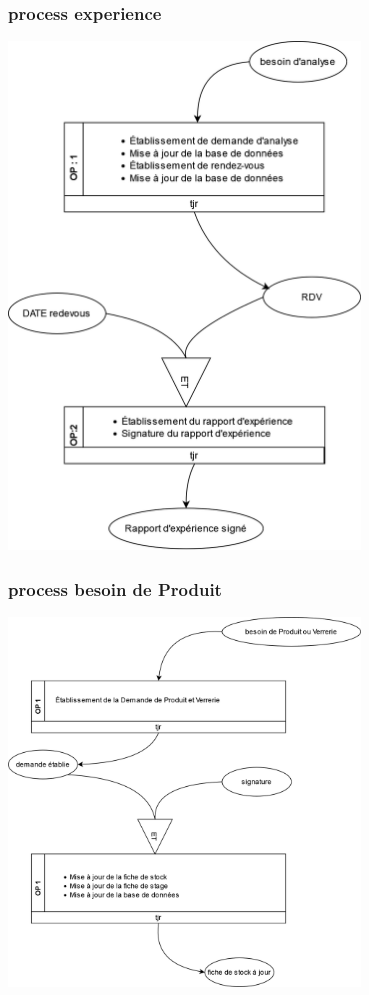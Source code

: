 \subsubsection{process experience}
\includegraphics[width=0.7\textwidth]{chapter/Conceptual Study/processus/experience.mct.png}
\subsubsection{process besoin de Produit}
\includegraphics[width=0.7\textwidth]{chapter/Conceptual Study/processus/besoin.mct.png}
